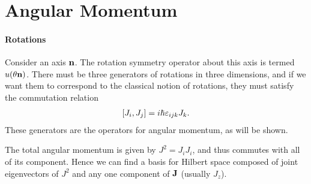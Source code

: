 \section{Angular Momentum}

\paragraph{Rotations}
Consider an axis $\vb{n}$. The rotation symmetry operator about this axis is termed $u(\theta\vb{n})$. There must be three generators of rotations in three dimensions, and if we want them to correspond to the classical notion of rotations, they must satisfy the commutation relation
\begin{align*}
	\comm{J_{i}}{J_{j}} = i\hbar\varepsilon_{ijk}J_{k}.
\end{align*}
These generators are the operators for angular momentum, as will be shown.

The total angular momentum is given by $J^{2} = J_{i}J_{i}$, and thus commutes with all of its component. Hence we can find a basis for Hilbert space composed of joint eigenvectors of $J^{2}$ and any one component of $\vb{J}$ (usually $J_{z}$).

